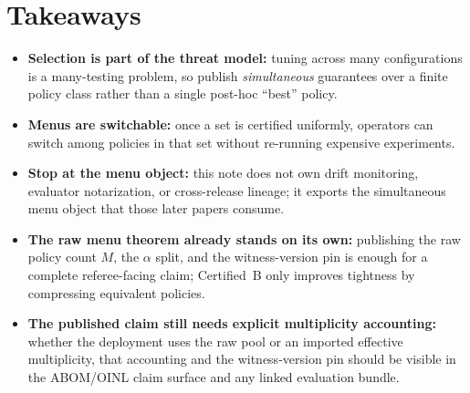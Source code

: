 \documentclass[11pt]{article}
\begin{document}
\section{Takeaways}
\begin{itemize}[leftmargin=*]
\item \textbf{Selection is part of the threat model:} tuning across many configurations is a many-testing problem, so publish \emph{simultaneous} guarantees over a finite policy class rather than a single post-hoc ``best'' policy.
\item \textbf{Menus are switchable:} once a set is certified uniformly, operators can switch among policies in that set without re-running expensive experiments.
\item \textbf{Stop at the menu object:} this note does not own drift monitoring, evaluator notarization, or cross-release lineage; it exports the simultaneous menu object that those later papers consume.
\item \textbf{The raw menu theorem already stands on its own:} publishing the raw policy count $M$, the $\alpha$ split, and the witness-version pin is enough for a complete referee-facing claim; Certified~B only improves tightness by compressing equivalent policies.
\item \textbf{The published claim still needs explicit multiplicity accounting:} whether the deployment uses the raw pool or an imported effective multiplicity, that accounting and the witness-version pin should be visible in the ABOM/OINL claim surface and any linked evaluation bundle.
\end{itemize}
\end{document}
